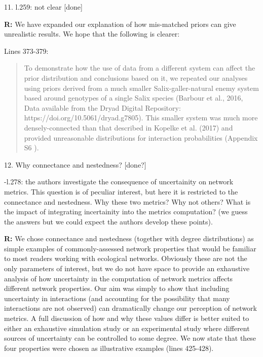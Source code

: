 \documentclass[12pt]{letter}
\newenvironment{refquote}{\bigskip \begin{it}}{\end{it}\smallskip}
\begin{document}
	11. l.259: not clear [done]
	
		
		\textbf{R:} We have expanded our explanation of how mis-matched priors can give unrealistic results. We hope that the following is clearer:


		Lines 373-379:


		\begin{quotation}
			To demonstrate how the use of data from a different system can affect the prior distribution and conclusions based on it, we repeated our analyses using priors derived from a much smaller Salix-galler-natural enemy system based around genotypes of a single Salix species (Barbour et al., 2016, Data available from the Dryad Digital Repository: https://doi.org/10.5061/dryad.g7805). This smaller system was much more densely-connected than that described in Kopelke et al. (2017) and provided unreasonable distributions for interaction probabilities (Appendix S6 ).
		\end{quotation}


	12. Why connectance and nestedness? [done?]


		\begin{refquote}
			-l.278: the authors investigate the consequence of uncertainity on network metrics. This question is of peculiar interest, but here it is restricted to the connectance and nestedness. Why these two metrics? Why not others? What is the impact of integrating incertainity into the metrics computation? (we guess the answers but we could expect the authors develop these points).
		\end{refquote}


		\textbf{R:} We chose connectance and nestedness (together with degree distributions) as simple examples of commonly-assessed network properties that would be familiar to most readers working with ecological networks. Obviously these are not the only parameters of interest, but we do not have space to provide an exhaustive analysis of how uncertainty in the computation of network metrics affects different network properties. Our aim was simply to show that including uncertainty in interactions (and accounting for the possibility that many interactions are not observed) can dramatically change our perception of network metrics. A full discussion of how and why these values differ is better suited to either an exhaustive simulation study or an experimental study where different sources of uncertainty can be controlled to some degree. We now state that these four properties were chosen as illustrative examples (lines 425-428).
\end{document}
